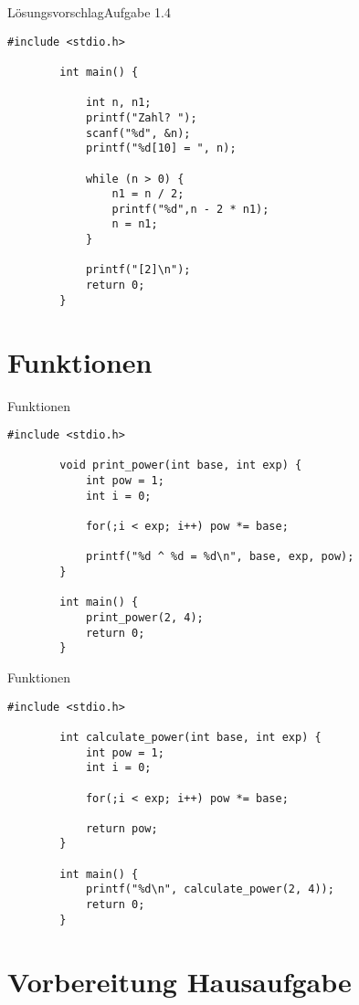 \documentclass[10pt]{beamer} %
\begin{document}
\begin{frame}[fragile]{Lösungsvorschlag}{Aufgabe 1.4}

	\begin{lstlisting}[gobble=4]
		#include <stdio.h>
		
		int main() {
			
			int n, n1;
			printf("Zahl? ");
			scanf("%d", &n);
			printf("%d[10] = ", n);
			
			while (n > 0) {
				n1 = n / 2;
				printf("%d",n - 2 * n1);
				n = n1;
			}
			
			printf("[2]\n");
			return 0;
		}
	\end{lstlisting}

\end{frame}

\section{Funktionen}

\begin{frame}[fragile]{Funktionen}

	\begin{lstlisting}[gobble=4]
		#include <stdio.h>
		
		void print_power(int base, int exp) {
			int pow = 1;
			int i = 0;
			
			for(;i < exp; i++) pow *= base;
			
			printf("%d ^ %d = %d\n", base, exp, pow);
		}
		
		int main() {
			print_power(2, 4);
			return 0;
		}
	\end{lstlisting}
	
\end{frame}

\begin{frame}[fragile]{Funktionen}

	\begin{lstlisting}[gobble=4]
		#include <stdio.h>
		
		int calculate_power(int base, int exp) {
			int pow = 1;
			int i = 0;
			
			for(;i < exp; i++) pow *= base;
			
			return pow;
		}
		
		int main() {
			printf("%d\n", calculate_power(2, 4));
			return 0;
		}
	\end{lstlisting}
	
\end{frame}

\section{Vorbereitung Hausaufgabe}
\end{document}
